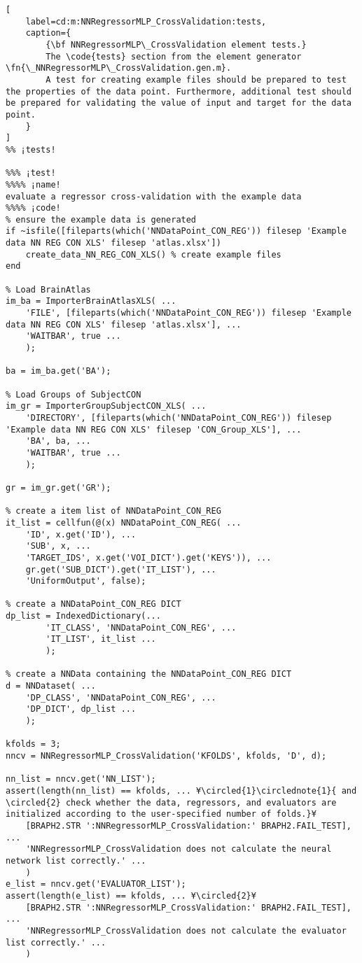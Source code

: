 \documentclass{tufte-handout}
\begin{document}
\begin{lstlisting}[
	label=cd:m:NNRegressorMLP_CrossValidation:tests,
	caption={
		{\bf NNRegressorMLP\_CrossValidation element tests.}
		The \code{tests} section from the element generator \fn{\_NNRegressorMLP\_CrossValidation.gen.m}.
		A test for creating example files should be prepared to test the properties of the data point. Furthermore, additional test should be prepared for validating the value of input and target for the data point.
	}
]			
%% ¡tests!

%%% ¡test!
%%%% ¡name!
evaluate a regressor cross-validation with the example data
%%%% ¡code!
% ensure the example data is generated
if ~isfile([fileparts(which('NNDataPoint_CON_REG')) filesep 'Example data NN REG CON XLS' filesep 'atlas.xlsx'])
    create_data_NN_REG_CON_XLS() % create example files
end

% Load BrainAtlas
im_ba = ImporterBrainAtlasXLS( ...
    'FILE', [fileparts(which('NNDataPoint_CON_REG')) filesep 'Example data NN REG CON XLS' filesep 'atlas.xlsx'], ...
    'WAITBAR', true ...
    );

ba = im_ba.get('BA');

% Load Groups of SubjectCON
im_gr = ImporterGroupSubjectCON_XLS( ...
    'DIRECTORY', [fileparts(which('NNDataPoint_CON_REG')) filesep 'Example data NN REG CON XLS' filesep 'CON_Group_XLS'], ...
    'BA', ba, ...
    'WAITBAR', true ...
    );

gr = im_gr.get('GR');

% create a item list of NNDataPoint_CON_REG
it_list = cellfun(@(x) NNDataPoint_CON_REG( ...
    'ID', x.get('ID'), ...
    'SUB', x, ...
    'TARGET_IDS', x.get('VOI_DICT').get('KEYS')), ...
    gr.get('SUB_DICT').get('IT_LIST'), ...
    'UniformOutput', false);

% create a NNDataPoint_CON_REG DICT
dp_list = IndexedDictionary(...
        'IT_CLASS', 'NNDataPoint_CON_REG', ...
        'IT_LIST', it_list ...
        );

% create a NNData containing the NNDataPoint_CON_REG DICT
d = NNDataset( ...
    'DP_CLASS', 'NNDataPoint_CON_REG', ...
    'DP_DICT', dp_list ...
    );

kfolds = 3;
nncv = NNRegressorMLP_CrossValidation('KFOLDS', kfolds, 'D', d);

nn_list = nncv.get('NN_LIST');
assert(length(nn_list) == kfolds, ... ¥\circled{1}\circlednote{1}{ and \circled{2} check whether the data, regressors, and evaluators are initialized according to the user-specified number of folds.}¥
    [BRAPH2.STR ':NNRegressorMLP_CrossValidation:' BRAPH2.FAIL_TEST], ...
    'NNRegressorMLP_CrossValidation does not calculate the neural network list correctly.' ...
    )
e_list = nncv.get('EVALUATOR_LIST');
assert(length(e_list) == kfolds, ... ¥\circled{2}¥
    [BRAPH2.STR ':NNRegressorMLP_CrossValidation:' BRAPH2.FAIL_TEST], ...
    'NNRegressorMLP_CrossValidation does not calculate the evaluator list correctly.' ...
    )

\end{lstlisting}
\end{document}
